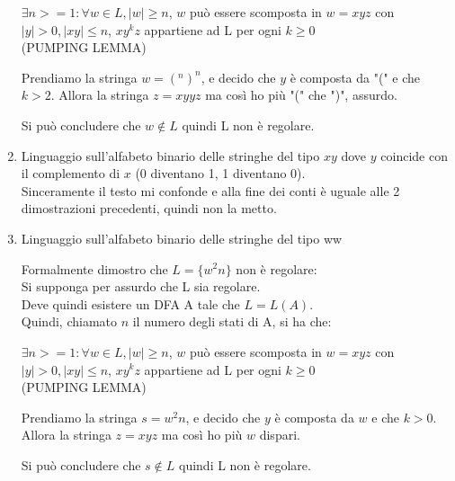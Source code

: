 \begin{enumerate}
$\exists n>=1: \forall w \in L, |w|\geq n$, $w$ può essere scomposta in $w=xyz$ con $|y|>0, |xy| \leq n$, 
$xy^kz$ appartiene ad L per ogni $k \geq 0$
\\ (PUMPING LEMMA)
\vspace{5mm}

Prendiamo la stringa $w=(^n)^n$, e decido che $y$ è composta da "(" e che $k>2$. Allora la stringa $z=xyyz$ ma così ho più "(" che ")", assurdo.

Si può concludere che $w \notin L$ quindi L non è regolare.


\item Linguaggio sull'alfabeto binario delle stringhe del tipo $xy$ dove $y$ coincide con il complemento di $x$ (0 diventano 1, 1 diventano 0). 
  \\ Sinceramente il testo mi confonde e alla fine dei conti è uguale alle 2 dimostrazioni precedenti, quindi non la metto.

\item Linguaggio sull'alfabeto binario delle stringhe del tipo ww

\vspace{5mm}
Formalmente dimostro che $L=\{ w^2n \}$ non è regolare:
\\ Si supponga per assurdo che L sia regolare.
\\ Deve quindi esistere un DFA A tale che $L=L(A)$.
\\ Quindi, chiamato $n$ il numero degli stati di A, si ha che:

$\exists n>=1: \forall w \in L, |w|\geq n$, $w$ può essere scomposta in $w=xyz$ con $|y|>0, |xy| \leq n$, 
$xy^kz$ appartiene ad L per ogni $k \geq 0$
\\ (PUMPING LEMMA)
\vspace{5mm}

Prendiamo la stringa $s=w^2n$, e decido che $y$ è composta da $w$ e che $k>0$. Allora la stringa $z=xyz$ ma così ho più $w$ dispari.

Si può concludere che $s \notin L$ quindi L non è regolare.
\end{enumerate}

